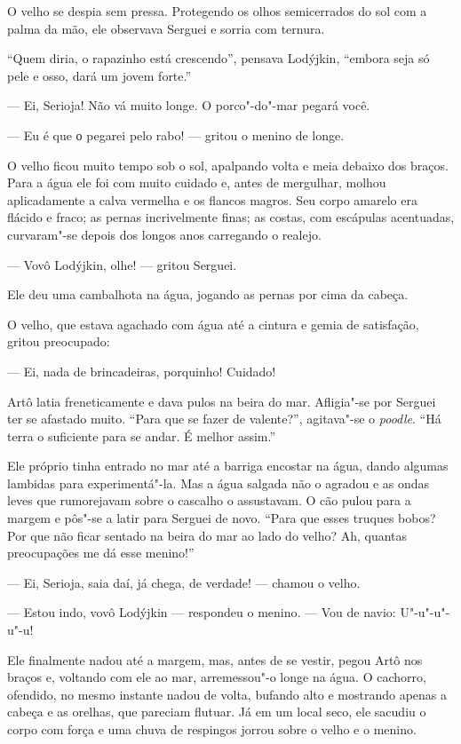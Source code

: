 O velho se despia sem pressa. Protegendo os olhos semicerrados do sol
com a palma da mão, ele observava Serguei e sorria com ternura.

``Quem diria, o rapazinho está crescendo'', pensava Lodýjkin, ``embora
seja só pele e osso, dará um jovem forte.''

--- Ei, Serioja! Não vá muito longe. O porco"-do"-mar pegará você.

--- Eu é que о pegarei pelo rabo! --- gritou o menino de longe.

O velho ficou muito tempo sob o sol, apalpando volta e meia debaixo dos
braços. Para a água ele foi com muito cuidado e, antes de mergulhar,
molhou aplicadamente a calva vermelha e os flancos magros. Seu corpo
amarelo era flácido e fraco; as pernas incrivelmente finas; as costas,
com escápulas acentuadas, curvaram"-se depois dos longos anos carregando
o realejo.

--- Vovô Lodýjkin, olhe! --- gritou Serguei.

Ele deu uma cambalhota na água, jogando as pernas por cima da cabeça.

O velho, que estava agachado com água até a cintura e gemia de
satisfação, gritou preocupado:

--- Ei, nada de brincadeiras, porquinho! Cuidado!

Artô latia freneticamente e dava pulos na beira do mar. Afligia"-se por
Serguei ter se afastado muito. ``Para que se fazer de valente?'',
agitava"-se o \emph{poodle}. ``Há terra o suficiente para se andar. É
melhor assim.''

Ele próprio tinha entrado no mar até a barriga encostar na água, dando
algumas lambidas para experimentá"-la. Mas a água salgada não o agradou e
as ondas leves que rumorejavam sobre o cascalho o assustavam. O cão
pulou para a margem e pôs"-se a latir para Serguei de novo. ``Para que
esses truques bobos? Por que não ficar sentado na beira do mar ao lado
do velho? Ah, quantas preocupações me dá esse menino!''

--- Ei, Serioja, saia daí, já chega, de verdade! --- chamou o velho.

--- Estou indo, vovô Lodýjkin --- respondeu o menino. --- Vou de navio:
U"-u"-u"-u"-u!

Ele finalmente nadou até a margem, mas, antes de se vestir, pegou Artô
nos braços e, voltando com ele ao mar, arremessou"-o longe na água. O
cachorro, ofendido, no mesmo instante nadou de volta, bufando alto e mostrando apenas a cabeça e
as orelhas, que pareciam flutuar. Já em um local
seco, ele sacudiu o corpo com força e uma chuva de respingos jorrou
sobre o velho e o menino.

